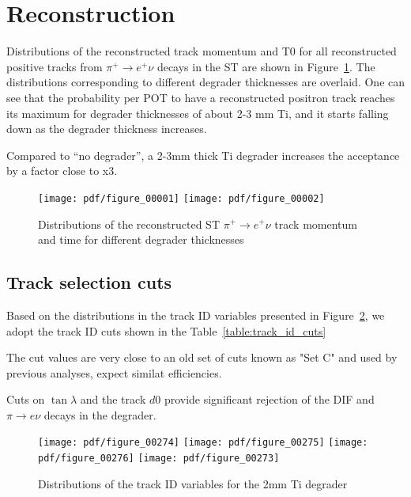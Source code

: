 \newpage
\section {Reconstruction }

Distributions of the reconstructed track momentum and T0 for all reconstructed positive
tracks from $\pi^+ \to e^+ \nu $ decays in the ST are shown in Figure~\ref{fig:all_tracks_p_t0}.
The distributions corresponding to different degrader thicknesses are overlaid.
One can see that the probability per POT to have a reconstructed positron track reaches its maximum
for degrader thicknesses of about 2-3 mm Ti, and it starts falling down as the degrader thickness
increases.

Compared to ``no degrader'', a 2-3mm thick Ti degrader increases the acceptance by a factor
close to x3.

\begin{figure}[H]
  \texttt{[image: pdf/figure\_00001]}
  \texttt{[image: pdf/figure\_00002]}
  \caption{
    \label{fig:all_tracks_p_t0}
    Distributions of the reconstructed ST $\pi^+ \to e^+ \nu$ track momentum and time
    for different degrader thicknesses
  }
\end{figure}

\subsection{Track selection cuts}

Based on the distributions in the track ID variables presented in Figure~\ref{fig:tid_variables_2mm},
we adopt the track ID cuts shown in the Table~\ref{table:track_id_cuts}

The cut values are very close to an old set of cuts known as "Set C" and used by previous
analyses, expect similat efficiencies.

Cuts on $\tan \lambda$ and the track $d0$ provide significant rejection of the DIF
and $\pi \to e \nu$ decays in the degrader.

\begin{figure}[H]
  \texttt{[image: pdf/figure\_00274]}  %
  \texttt{[image: pdf/figure\_00275]}  %
  \texttt{[image: pdf/figure\_00276]}  %
  \texttt{[image: pdf/figure\_00273]}  %
  \caption{
    \label{fig:tid_variables_2mm}
    Distributions of the track ID variables for the 2mm Ti degrader
  }
\end{figure}

